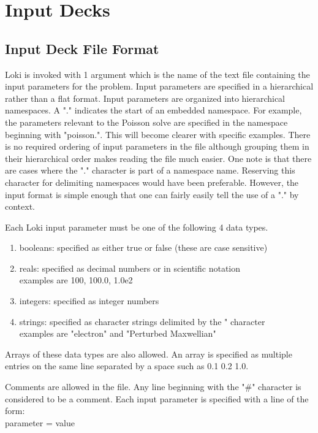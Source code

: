 \documentclass[11pt]{amsart}
\begin{document}
\section*{Input Decks}
\subsection*{Input Deck File Format}
Loki is invoked with 1 argument which is the name of the text file containing
the input parameters for the problem.  Input parameters are specified in a
hierarchical rather than a flat format.  Input parameters are organized into
hierarchical namespaces.  A "." indicates the start of an embedded namespace.
For example, the parameters relevant to the Poisson solve are specified in the
namespace beginning with "poisson.".  This will become clearer with specific
examples.  There is no required ordering of input parameters in the file
although grouping them in their hierarchical order makes reading the file much
easier.  One note is that there are cases where the "." character is part of a
namespace name.  Reserving this character for delimiting namespaces would have
been preferable.  However, the input format is simple enough that one can
fairly easily tell the use of a "." by context.

Each Loki input parameter must be one of the following 4 data types.
\begin{enumerate}
\item booleans: specified as either true or false (these are case sensitive)
\item reals: specified as decimal numbers or in scientific notation \\
       examples are 100, 100.0, 1.0e2
\item integers: specified as integer numbers
\item strings: specified as character strings delimited by the " character \\
         examples are "electron" and "Perturbed Maxwellian"
\end{enumerate}
Arrays of these data types are also allowed.  An array is specified as multiple
entries on the same line separated by a space such as 0.1 0.2 1.0.

Comments are allowed in the file.  Any line beginning with the "\#" character
is considered to be a comment.  Each input parameter is specified with a line
of the form: \\
parameter = value
\end{document}
